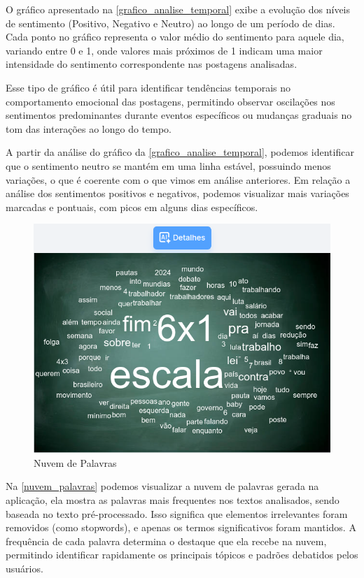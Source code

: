 \documentclass[
	12pt,				%
	oneside,			%
	a4paper,			%
	english,			%
	french,				%
	spanish,			%
	brazil				%
	]{abntex2}
\begin{document}
O gráfico apresentado na \autoref{grafico_analise_temporal} exibe a
evolução dos níveis de sentimento (Positivo, Negativo e Neutro) ao longo
de um período de dias. Cada ponto no gráfico representa o valor médio do
sentimento para aquele dia, variando entre 0 e 1, onde valores mais
próximos de 1 indicam uma maior intensidade do sentimento correspondente
nas postagens analisadas.

Esse tipo de gráfico é útil para identificar tendências temporais no
comportamento emocional das postagens, permitindo observar oscilações
nos sentimentos predominantes durante eventos específicos ou mudanças
graduais no tom das interações ao longo do tempo.

A partir da análise do gráfico da \autoref{grafico_analise_temporal},
podemos identificar que o sentimento neutro se mantém em uma linha
estável, possuindo menos variações, o que é coerente com o que vimos em
análise anteriores. Em relação a análise dos sentimentos positivos e
negativos, podemos visualizar mais variações marcadas e pontuais, com
picos em alguns dias específicos.

\begin{figure}[htbp]
\hypertarget{nuvem_palavras}{%
\caption{Nuvem de Palavras}\label{nuvem_palavras}
\begin{center}
\includegraphics[scale=0.4]{imagens/sentilytics/estudo-caso/bag_of_words.png}
\end{center}
}
\end{figure}

Na \autoref{nuvem_palavras} podemos visualizar a nuvem de palavras
gerada na aplicação, ela mostra as palavras mais frequentes nos textos
analisados, sendo baseada no texto pré-processado. Isso significa que
elementos irrelevantes foram removidos (como stopwords), e apenas os
termos significativos foram mantidos. A frequência de cada palavra
determina o destaque que ela recebe na nuvem, permitindo identificar
rapidamente os principais tópicos e padrões debatidos pelos usuários.
\end{document}

